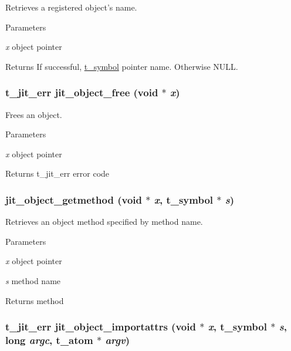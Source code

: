 Retrieves a registered object's name. 
\begin{DoxyParams}{Parameters}
\item[{\em x}]object pointer\end{DoxyParams}
\begin{DoxyReturn}{Returns}
If successful, \hyperlink{structt__symbol}{t\_\-symbol} pointer name. Otherwise NULL. 
\end{DoxyReturn}
\hypertarget{group__objectmod_ga64970b62e5afe7a2cbd57efd6e9e9f74}{
\subsubsection[{jit\_\-object\_\-free}]{\setlength{\rightskip}{0pt plus 5cm}t\_\-jit\_\-err jit\_\-object\_\-free (void $\ast$ {\em x})}}
\label{group__objectmod_ga64970b62e5afe7a2cbd57efd6e9e9f74}


Frees an object. 
\begin{DoxyParams}{Parameters}
\item[{\em x}]object pointer\end{DoxyParams}
\begin{DoxyReturn}{Returns}
t\_\-jit\_\-err error code 
\end{DoxyReturn}
\hypertarget{group__objectmod_gaeba4eb06443064c2cb4b9c45edeb7ab2}{
\subsubsection[{jit\_\-object\_\-getmethod}]{ jit\_\-object\_\-getmethod (void $\ast$ {\em x}, \/  {\bf t\_\-symbol} $\ast$ {\em s})}}
\label{group__objectmod_gaeba4eb06443064c2cb4b9c45edeb7ab2}


Retrieves an object method specified by method name. 
\begin{DoxyParams}{Parameters}
\item[{\em x}]object pointer \item[{\em s}]method name\end{DoxyParams}
\begin{DoxyReturn}{Returns}
method 
\end{DoxyReturn}
\hypertarget{group__objectmod_ga29a1be851f1e88aa459689681d8b996e}{
\subsubsection[{jit\_\-object\_\-importattrs}]{\setlength{\rightskip}{0pt plus 5cm}t\_\-jit\_\-err jit\_\-object\_\-importattrs (void $\ast$ {\em x}, \/  {\bf t\_\-symbol} $\ast$ {\em s}, \/  long {\em argc}, \/  {\bf t\_\-atom} $\ast$ {\em argv})}}
\label{group__objectmod_ga29a1be851f1e88aa459689681d8b996e}


